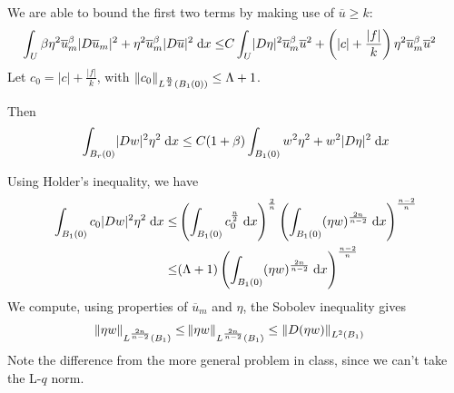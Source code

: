 We are able to bound the first two terms by making use of $\overline{u} \geq k$:
\begin{align*}
  \int_{\domain} \beta \eta^2 \overline{u}_m^\beta \lvert \grad \overline{u}_m \rvert^2
      + \eta^2 \overline{u}_m^\beta \lvert \grad \overline{u} \rvert^2 \dx
    \leq & C \int_{\domain} \lvert \grad \eta \rvert^2 \overline{u}_m^\beta \overline{u}^2
      + \left( \lvert c \rvert + \frac{\lvert f \rvert}{k} \right) \eta^2 \overline{u}_m^\beta \overline{u}^2
\end{align*}
Let $c_0 = \lvert c \rvert + \frac{\lvert f \rvert}{k}$,
with $\lnorm{c_0}{\frac{n}{2}}{\ball{0}{1}} \leq \Lambda + 1$.

Then
\begin{align*}
  \int_{\ball{0}{r}} \lvert \grad w \rvert^2 \eta^2 \dx
    \leq C (1 + \beta) \int_{\ball{0}{1}} w^2 \eta^2 + w^2 \lvert \grad \eta \rvert^2 \dx
\end{align*}

Using Holder's inequality, we have
\begin{align*}
  \int_{\ball{0}{1}} c_0 \lvert \grad w \rvert^2 \eta^2 \dx
    \leq & \left( \int_{\ball{0}{1}} c_0^{\frac{n}{2}} \dx \right)^{\frac{2}{n}}
           \left( \int_{\ball{0}{1}} (\eta w)^{\frac{2 n}{n - 2}} \dx \right)^{\frac{n - 2}{n}}\\
    \leq & (\Lambda + 1)
           \left( \int_{\ball{0}{1}} (\eta w)^{\frac{2 n}{n - 2}} \dx \right)^{\frac{n - 2}{n}}
\end{align*}
We compute, using properties of $\overline{u}_m$ and $\eta$, the Sobolev inequality gives
\begin{align*}
  \lnorm{\eta w}{\frac{2 n}{n - 2}}{\ballunit} \leq &
    \lnorm{\eta w}{\frac{2 n}{n - 2}}{\ballunit}
    \leq \lnorm{\grad (\eta w)}{2}{\ballunit}
\end{align*}
Note the difference from the more general problem in class,
since we can't take the L-$q$ norm.

